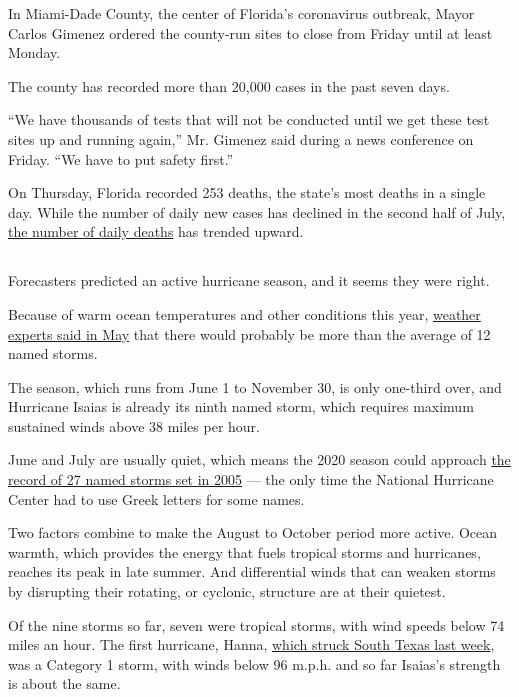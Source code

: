 In Miami-Dade County, the center of Florida's coronavirus outbreak,
Mayor Carlos Gimenez ordered the county-run sites to close from Friday
until at least Monday.

The county has recorded more than 20,000 cases in the past seven days.

``We have thousands of tests that will not be conducted until we get
these test sites up and running again,'' Mr. Gimenez said during a news
conference on Friday. ``We have to put safety first.''

On Thursday, Florida recorded 253 deaths, the state's most deaths in a
single day. While the number of daily new cases has declined in the
second half of July,
\href{https://www.nytimes.com/interactive/2020/us/florida-coronavirus-cases.html}{the
number of daily deaths} has trended upward.

\hypertarget{-4}{%
\subsection{}\label{-4}}

Forecasters predicted an active hurricane season, and it seems they were
right.

Because of warm ocean temperatures and other conditions this year,
\href{https://www.nytimes.com/2020/05/21/climate/hurricane-season-2020-noaa.html}{weather
experts said in May} that there would probably be more than the average
of 12 named storms.

The season, which runs from June 1 to November 30, is only one-third
over, and Hurricane Isaias is already its ninth named storm, which
requires maximum sustained winds above 38 miles per hour.

June and July are usually quiet, which means the 2020 season could
approach
\href{https://slack-redir.net/link?url=https\%3A\%2F\%2Fwww.nhc.noaa.gov\%2Fdata\%2Ftcr\%2Findex.php\%3Fseason\%3D2005\%26basin\%3Datl}{the
record of 27 named storms set in 2005} --- the only time the National
Hurricane Center had to use Greek letters for some names.

Two factors combine to make the August to October period more active.
Ocean warmth, which provides the energy that fuels tropical storms and
hurricanes, reaches its peak in late summer. And differential winds that
can weaken storms by disrupting their rotating, or cyclonic, structure
are at their quietest.

Of the nine storms so far, seven were tropical storms, with wind speeds
below 74 miles an hour. The first hurricane, Hanna,
\href{https://www.nytimes.com/2020/07/26/us/virus-texas-storm.html}{which
struck South Texas last week}, was a Category 1 storm, with winds below
96 m.p.h. and so far Isaias's strength is about the same.

